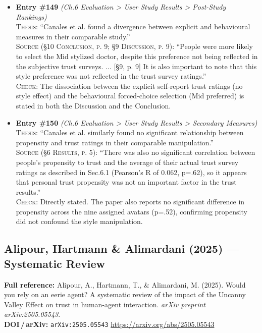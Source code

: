 \documentclass[11pt, a4paper]{article}
\begin{document}
\begin{itemize}[leftmargin=1.2em,itemsep=4pt]
\textsc{Check:} The paper draws a positive design conclusion ('realistic avatars are not required') directly from non-significant results. No equivalence test, TOST procedure, or Bayesian null-evidence analysis appears anywhere in the paper, so the inference does rest on non-significance alone.
\item \textbf{Entry \#149} \textit{(Ch.6 Evaluation > User Study Results > Post-Study Rankings)}\\
\textsc{Thesis:} ``Canales et al. found a divergence between explicit and behavioural measures in their comparable study.''\\
\textsc{Source (§10 Conclusion, p. 9; §9 Discussion, p. 9):} ``People were more likely to select the Mid stylized doctor, despite this preference not being reflected in the subjective trust surveys. ... [§9, p. 9] It is also important to note that this style preference was not reflected in the trust survey ratings.''\\
\textsc{Check:} The dissociation between the explicit self-report trust ratings (no style effect) and the behavioural forced-choice selection (Mid preferred) is stated in both the Discussion and the Conclusion.
\item \textbf{Entry \#150} \textit{(Ch.6 Evaluation > User Study Results > Secondary Measures)}\\
\textsc{Thesis:} ``Canales et al. similarly found no significant relationship between propensity and trust ratings in their comparable manipulation.''\\
\textsc{Source (§6 Results, p. 5):} ``There was also no significant correlation between people's propensity to trust and the average of their actual trust survey ratings as described in Sec.6.1 (Pearson's R of 0.062, p=.62), so it appears that personal trust propensity was not an important factor in the trust results.''\\
\textsc{Check:} Directly stated. The paper also reports no significant difference in propensity across the nine assigned avatars (p=.52), confirming propensity did not confound the style manipulation.
\end{itemize}

\vspace{8pt}
\subsection{Alipour, Hartmann \& Alimardani (2025) --- Systematic Review}

\begin{refbox}
\textbf{Full reference:} Alipour, A., Hartmann, T., \& Alimardani, M. (2025). Would you rely on an eerie agent? A systematic review of the impact of the Uncanny Valley Effect on trust in human-agent interaction. \textit{arXiv preprint arXiv:2505.05543}.\\[4pt]
\textbf{DOI\,/\,arXiv:} \texttt{arXiv:2505.05543} \quad \url{https://arxiv.org/abs/2505.05543}
\end{refbox}
\end{document}

